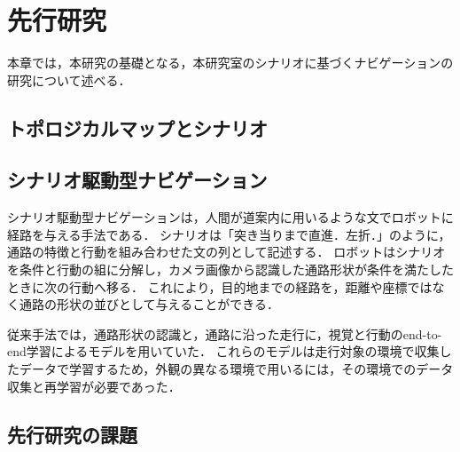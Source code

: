 \chapter{先行研究}
\label{chap:prior_work}

本章では，本研究の基礎となる，本研究室のシナリオに基づくナビゲーションの研究について述べる．

\section{トポロジカルマップとシナリオ}
\label{sec:prior_topological}


\section{シナリオ駆動型ナビゲーション}
\label{sec:related_scenario}

シナリオ駆動型ナビゲーション\cite{scenario_si2023}は，人間が道案内に用いるような文でロボットに経路を与える手法である．
シナリオは「突き当りまで直進．左折．」のように，通路の特徴と行動を組み合わせた文の列として記述する．
ロボットはシナリオを条件と行動の組に分解し，カメラ画像から認識した通路形状が条件を満たしたときに次の行動へ移る．
これにより，目的地までの経路を，距離や座標ではなく通路の形状の並びとして与えることができる．

従来手法では，通路形状の認識と，通路に沿った走行に，視覚と行動のend-to-end学習によるモデルを用いていた\cite{scenario_si2023}．
これらのモデルは走行対象の環境で収集したデータで学習するため，外観の異なる環境で用いるには，その環境でのデータ収集と再学習が必要であった．

\section{先行研究の課題}
\label{sec:prior_issue}

